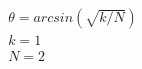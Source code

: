 \documentclass[preview]{standalone}
\begin{document}
\begin{align*}
\theta = arcsin(\sqrt{k/N})\\k=1\\N=2
\end{align*}
\end{document}
